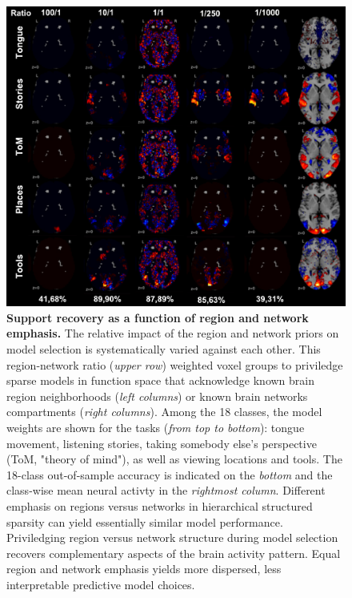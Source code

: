 \documentclass{article} %
\begin{document}
\begin{figure}
\begin{centering}
\includegraphics[width=1.00\textwidth]{figures/reg_net_ratio.pdf}
\end{centering}
\vspace{-0.6cm}
\caption{\textbf{Support recovery as a function of
region and network emphasis.}
The relative impact of the region and network priors
on model selection
is systematically varied against each other.
This region-network ratio (\textit{upper row}) weighted voxel groups
to priviledge sparse models in function space
that acknowledge known brain region neighborhoods
(\textit{left columns}) or
known brain networks compartments
(\textit{right columns}).
Among the 18 classes, the model weights are shown for the
tasks (\textit{from top to bottom}): tongue movement, listening stories,
taking somebody else's perspective (ToM, "theory of mind"),
as well as
viewing locations and tools.
The 18-class out-of-sample accuracy is indicated
on the \textit{bottom} and
the class-wise mean neural activty
in the \textit{rightmost column}.
%
Different emphasis on regions versus networks
in hierarchical structured sparsity can
yield essentially similar model performance.
%
Priviledging region versus network structure during model selection
recovers complementary aspects of the brain activity pattern.
%
Equal region and network emphasis yields more dispersed,
less interpretable predictive model choices.
}
\label{fig_ratio}
\end{figure}
\end{document}
